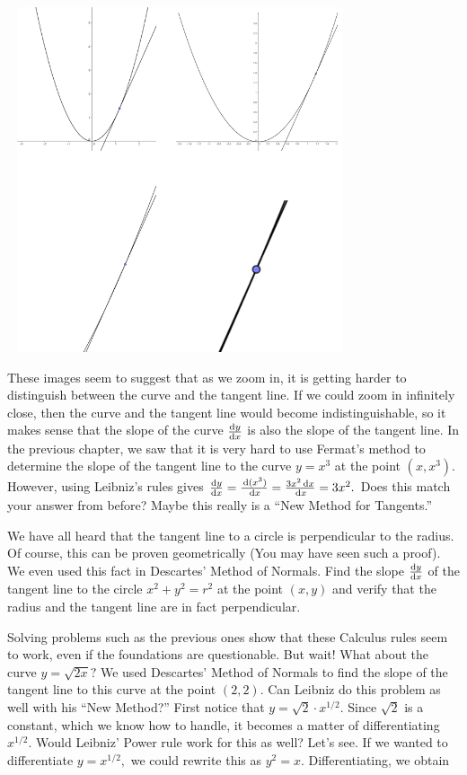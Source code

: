 \centerline{\includegraphics*[height=4in,width=4in]{Figures/parabola-zoom}}

These images seem to suggest that as we zoom in, it is getting harder
to distinguish between the curve and the tangent line.  If we could
zoom in infinitely close, then the curve and the tangent line would
become indistinguishable, so it makes sense that the slope of the
curve $\frac{\text{d}{y}}{\text{d}{x}}$ is also the slope of the tangent line.  In the
previous chapter, we saw that it is very hard  to use Fermat's method to determine
the slope of the tangent line to the curve $y=x^3$ at the point
$(x,x^3).$ However, using  Leibniz's rules gives
$\frac{\text{d}{y}}{\text{d}{x}}=\frac{\thinspace{\rm d}(x^3 )}{\thinspace{\rm d}x}=\frac{3x^2 \thinspace{\rm d}x}{\thinspace{\rm d}x}=3x^2.$ Does
this match your answer from before?  Maybe this really is a ``New
Method for Tangents.''

\begin{embeddedproblem}{}
  We have all heard that the tangent line to a circle is perpendicular
  to the radius.  Of course, this can be proven geometrically (You may
  have seen such a proof).  We even used this fact in Descartes'
  Method of Normals.  Find the slope $\frac{\text{d}{y}}{\text{d}{x}}$ of the tangent line to the
  circle $x^2+y^2=r^2$ at the point $(x,y)$ and verify that the radius and
  the tangent line are in fact perpendicular.  
\end{embeddedproblem}

  
Solving problems such as the previous ones show that these Calculus
rules seem to work, even if the foundations are questionable.  But
wait!  What about the curve $y=\sqrt{2x}?$  We used Descartes' Method of
Normals to find the slope of the tangent line to this curve at the
point $(2,2).$  Can Leibniz do this problem as well with his ``New
Method?''  First notice that $y=\sqrt{2}\cdot x^{1/2}.$  Since $\sqrt{2}$ is a constant,
which we know how to handle, it becomes a matter of differentiating
$x^{1/2}.$  Would Leibniz' Power rule work for this as well?  Let's
see.  If we wanted to differentiate $y=x^{1/2},$ we could rewrite this
as $y^2=x.$  Differentiating, we obtain

